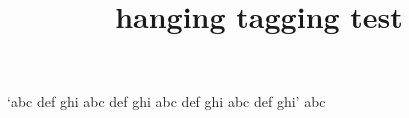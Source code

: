 \documentclass{article}
\title{hanging tagging test}
\begin{document}
\kant[1-2]
\kant[3-4]
\begin{hangparas}{2cm}{3}
\kant[5-6]
\end{hangparas}

\noindent\begin{minipage}{10em}
\begin{hangpunct}
`abc def ghi abc def ghi abc def ghi abc def ghi' abc
\end{hangpunct}
\end{minipage}
\end{document}

